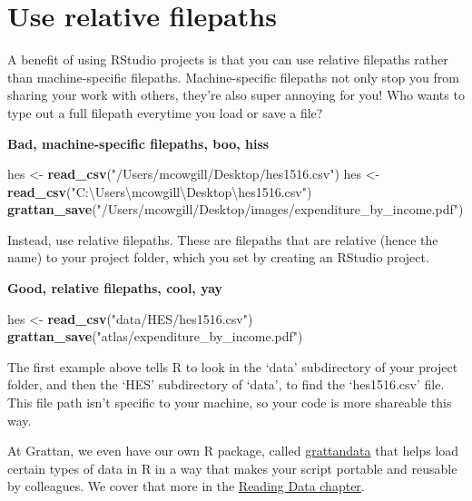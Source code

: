 \documentclass[
]{book}
\newenvironment{Shaded}{\begin{snugshade}}{\end{snugshade}}
\newcommand{\KeywordTok}[1]{\textcolor[rgb]{0.13,0.29,0.53}{\textbf{#1}}}
\newcommand{\NormalTok}[1]{#1}
\newcommand{\StringTok}[1]{\textcolor[rgb]{0.31,0.60,0.02}{#1}}
\begin{document}
\hypertarget{use-relative-filepaths}{%
\section{Use relative filepaths}\label{use-relative-filepaths}}

A benefit of using RStudio projects is that you can use relative filepaths rather than machine-specific filepaths. Machine-specific filepaths not only stop you from sharing your work with others, they're also super annoying for you! Who wants to type out a full filepath everytime you load or save a file?

\textbf{Bad, machine-specific filepaths, boo, hiss}

\begin{Shaded}
\begin{Highlighting}[]
\NormalTok{hes \textless{}{-}}\StringTok{ }\KeywordTok{read\_csv}\NormalTok{(}\StringTok{"/Users/mcowgill/Desktop/hes1516.csv"}\NormalTok{)}
\NormalTok{hes \textless{}{-}}\StringTok{ }\KeywordTok{read\_csv}\NormalTok{(}\StringTok{"C:\textbackslash{}Users\textbackslash{}mcowgill\textbackslash{}Desktop\textbackslash{}hes1516.csv"}\NormalTok{)}
\KeywordTok{grattan\_save}\NormalTok{(}\StringTok{"/Users/mcowgill/Desktop/images/expenditure\_by\_income.pdf"}\NormalTok{)}
\end{Highlighting}
\end{Shaded}

Instead, use relative filepaths. These are filepaths that are relative (hence the name) to your project folder, which you set by creating an RStudio project.

\textbf{Good, relative filepaths, cool, yay}

\begin{Shaded}
\begin{Highlighting}[]
\NormalTok{hes \textless{}{-}}\StringTok{ }\KeywordTok{read\_csv}\NormalTok{(}\StringTok{"data/HES/hes1516.csv"}\NormalTok{)}
\KeywordTok{grattan\_save}\NormalTok{(}\StringTok{"atlas/expenditure\_by\_income.pdf"}\NormalTok{)}
\end{Highlighting}
\end{Shaded}

The first example above tells R to look in the `data' subdirectory of your project folder, and then the `HES' subdirectory of `data', to find the `hes1516.csv' file. This file path isn't specific to your machine, so your code is more shareable this way.

At Grattan, we even have our own R package, called \href{https://github.com/grattan/grattandata}{grattandata} that helps load certain types of data in R in a way that makes your script portable and reusable by colleagues. We cover that more in the \protect\hyperlink{read_microdata}{Reading Data chapter}.
\end{document}
